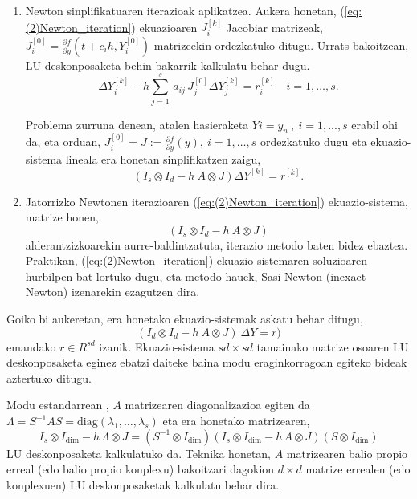 \begin{enumerate}
\item Newton sinplifikatuaren iterazioak aplikatzea. 
Aukera honetan, (\ref{eq:(2)Newton_iteration}) ekuazioaren $J_i^{[k]}$ Jacobiar matrizeak, $J_i^{[0]}=\frac{\partial f}{\partial y}(t+c_ih, Y_i^{[0]})$ matrizeekin ordezkatuko ditugu. Urrats bakoitzean, LU deskonposaketa behin bakarrik kalkulatu behar dugu.
\begin{equation*}
\Delta Y_{i}^{[k]}  - h \sum_{j=1}^{s}\, a_{ij}\, J_j^{[0]} \Delta Y_{j}^{[k]} = r_i^{[k]} \quad  i=1 ,\ldots, s.
\end{equation*}

Problema zurruna denean, atalen hasieraketa $Y i = y_n \ , \ i = 1, . . . , s$ erabil ohi da, eta orduan, $J_i^{[0]}=J:=\frac{\partial f}{\partial y}(y), \ i=1,\dots,s$ ordezkatuko dugu eta ekuazio-sistema lineala era honetan sinplifikatzen zaigu,
\begin{equation*}
(I_s \otimes I_d - h \ A \otimes J) \Delta Y^{[k]} = r^{[k]}.
\end{equation*} 

\item Jatorrizko Newtonen iterazioaren (\ref{eq:(2)Newton_iteration}) ekuazio-sistema, matrize honen,
\begin{equation}
\label{eq:irksys}
(I_s \otimes I_d - h \ A \otimes J)
\end{equation}
alderantzizkoarekin aurre-baldintzatuta, iterazio metodo \cite{Saad2003} baten bidez ebaztea. Praktikan, (\ref{eq:(2)Newton_iteration}) ekuazio-sistemaren soluzioaren hurbilpen bat lortuko dugu, eta metodo hauek, Sasi-Newton (inexact Newton) izenarekin ezagutzen dira.    
\end{enumerate}

Goiko bi aukeretan, era honetako ekuazio-sistemak askatu behar ditugu,
\begin{equation}
(I_d \otimes I_d - h \ A \otimes J) \ \Delta Y = r )
\end{equation} 
emandako $r \in R^{sd}$ izanik. Ekuazio-sistema $sd \times sd$ tamainako matrize osoaren LU deskonposaketa eginez ebatzi daiteke baina modu eraginkorragoan egiteko bideak aztertuko ditugu.

Modu estandarrean  \cite{Butcher1976,Liniger1970,Bickart1977} , $A$ matrizearen diagonalizazioa egiten da $\Lambda = S^{-1} A S=\mathrm{diag}(\lambda_1,\ldots,\lambda_s)$ eta era honetako matrizearen,
\begin{equation*}
I_s \otimes I_\dim  - h \, \Lambda \otimes J = (S^{-1} \otimes I_\dim) \left( I_s \otimes I_\dim  - h \, A \otimes J\right) (S \otimes I_\dim)
\end{equation*}
LU deskonposaketa kalkulatuko da. Teknika honetan, $A$ matrizearen balio propio erreal (edo balio propio konplexu) bakoitzari dagokion $d \times d$ matrize errealen (edo konplexuen) LU deskonposaketak kalkulatu behar dira.

